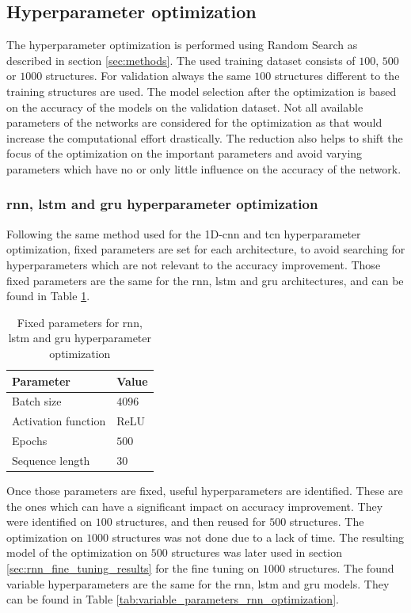 \documentclass[conference]{IEEEtran}
\begin{document}
\subsection{Hyperparameter optimization}
\label{sec:hyperparameter_optimization_results}

The hyperparameter optimization is performed using Random Search as described in section \ref{sec:methods}. The used training dataset consists of $ 100 $, $ 500 $ or $ 1000 $ structures. For validation always the same $ 100 $ structures different to the training structures are used. The model selection after the optimization is based on the accuracy of the models on the validation dataset. Not all available parameters of the networks are considered for the optimization as that would increase the computational effort drastically. The reduction also helps to shift the focus of the optimization on the important parameters and avoid varying parameters which have no or only little influence on the accuracy of the network.

\subsubsection{\gls{rnn}, \gls{lstm} and \gls{gru} hyperparameter optimization}
\label{sec:rnn_hyperparameter_optimization}

Following the same method used for the 1D-\gls{cnn} and \gls{tcn} hyperparameter optimization, fixed parameters are set for each architecture, to avoid searching for hyperparameters which are not relevant to the accuracy improvement. Those fixed parameters are the same for the \gls{rnn}, \gls{lstm} and \gls{gru} architectures, and can be found in Table \ref{tab:fixed_parameters_rnn_optimization}.

\begin{table}[htp]
	\centering
	\caption{Fixed parameters for \gls{rnn}, \gls{lstm} and \gls{gru} hyperparameter optimization}
	\label{tab:fixed_parameters_rnn_optimization}
	\begin{tabular}{ll}
		\textbf{Parameter} & \textbf{Value} \\
		\hline
		Batch size & $ 4096 $ \\
		Activation function & ReLU \\
		Epochs & $ 500 $ \\
		Sequence length & $ 30 $ 
	\end{tabular}
\end{table}

Once those parameters are fixed, useful hyperparameters are identified. These are the ones which can have a significant impact on accuracy improvement. They were identified on $ 100 $ structures, and then reused for $ 500 $ structures. The optimization on $ 1000 $ structures was not done due to a lack of time. The resulting model of the optimization on $ 500 $ structures was later used in section \ref{sec:rnn_fine_tuning_results} for the fine tuning on $ 1000 $ structures. The found variable hyperparameters are the same for the \gls{rnn}, \gls{lstm} and \gls{gru} models. They can be found in Table \ref{tab:variable_parameters_rnn_optimization}.
\end{document}
